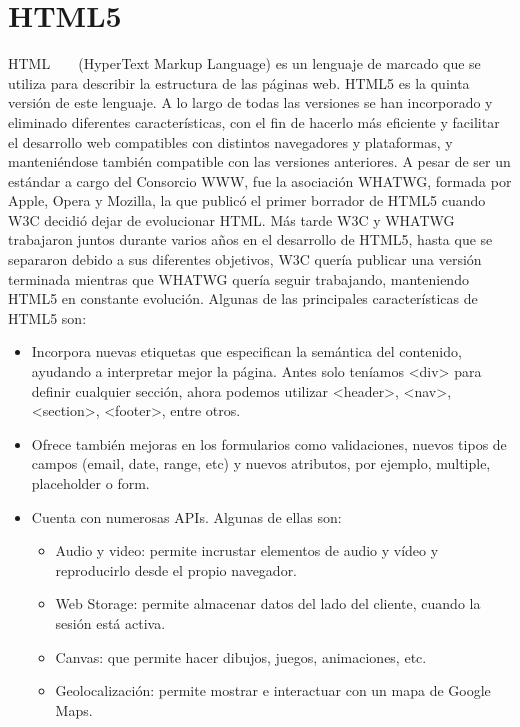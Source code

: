 \documentclass[a4paper, 12pt]{book}
\begin{document}
\section{HTML5} 
\label{sec:html5}

HTML ~\cite{htmlw3} ~\cite{htmlwhat} (HyperText Markup Language) es un lenguaje de marcado que se utiliza para describir la estructura de las páginas web. HTML5 es la quinta versión de este lenguaje. A lo largo de todas las versiones se han incorporado y eliminado diferentes características, con el fin de hacerlo más eficiente y facilitar el desarrollo web compatibles con distintos navegadores y plataformas, y manteniéndose también compatible con las versiones anteriores.
A pesar de ser un estándar a cargo del Consorcio WWW, fue la asociación WHATWG, formada por Apple, Opera y Mozilla, la que publicó el primer borrador de HTML5 cuando W3C decidió dejar de evolucionar HTML. Más tarde W3C y WHATWG trabajaron juntos durante varios años en el desarrollo de HTML5, hasta que se separaron debido a sus diferentes objetivos, W3C quería publicar una versión terminada mientras que WHATWG quería seguir trabajando, manteniendo HTML5 en constante evolución.
Algunas de las principales características de HTML5 son:
\begin{itemize}
	\item Incorpora nuevas etiquetas que especifican la semántica del contenido, ayudando a interpretar mejor la página. Antes solo teníamos \textless{}div\textgreater{} para definir cualquier sección, ahora podemos utilizar \textless{}header\textgreater{}, \textless{}nav\textgreater{}, \textless{}section\textgreater{}, \textless{}footer\textgreater{}, entre otros.

	\item Ofrece también mejoras en los formularios como validaciones, nuevos tipos de campos (email, date, range, etc) y nuevos atributos, por ejemplo, multiple, placeholder o form.

	\item Cuenta con numerosas APIs. Algunas de ellas son:

	\begin{itemize}

		\item Audio y video: permite incrustar elementos de audio y vídeo y reproducirlo desde el propio navegador.

		\item Web Storage: permite almacenar datos del lado del cliente, cuando la sesión está activa.

        	\item Canvas: que permite hacer dibujos, juegos, animaciones, etc.

		\item Geolocalización: permite mostrar e interactuar con un mapa de Google Maps.

	\end{itemize}
\end{itemize}
\end{document}
